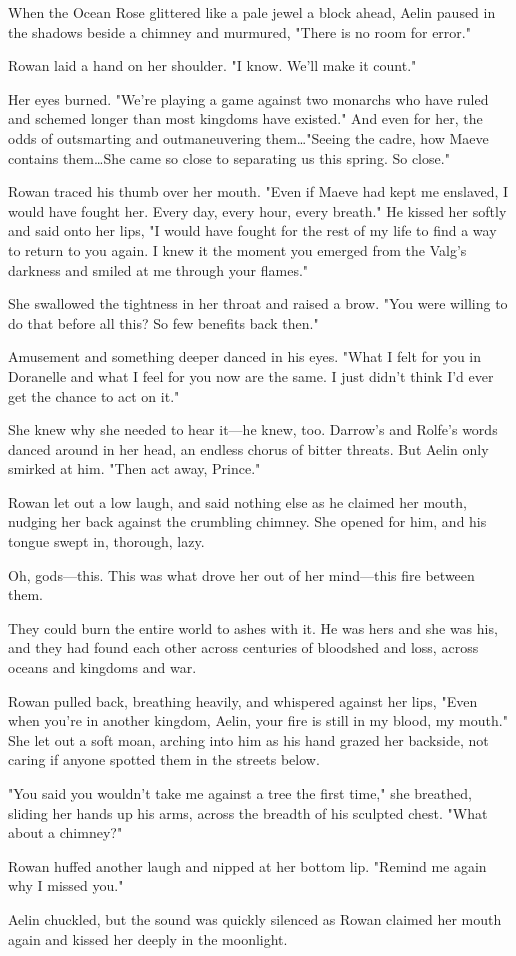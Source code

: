 When the Ocean Rose glittered like a pale jewel a block ahead, Aelin paused in the shadows beside a chimney and murmured, "There is no room for error."

Rowan laid a hand on her shoulder.
"I know.
We'll make it count."

Her eyes burned.
"We're playing a game against two monarchs who have ruled and schemed longer than most kingdoms have existed."
And even for her, the odds of outsmarting and outmaneuvering them\ldots "Seeing the cadre, how Maeve contains them\ldots She came so close to separating us this spring.
So close."

Rowan traced his thumb over her mouth.
"Even if Maeve had kept me enslaved, I would have fought her.
Every day, every hour, every breath."
He kissed her softly and said onto her lips, "I would have fought for the rest of my life to find a way to return to you again.
I knew it the moment you emerged from the Valg's darkness and smiled at me through your flames."

She swallowed the tightness in her throat and raised a brow.
"You were willing to do that before all this?
So few benefits back then."

Amusement and something deeper danced in his eyes.
"What I felt for you in Doranelle and what I feel for you now are the same.
I just didn't think I'd ever get the chance to act on it."

She knew why she needed to hear it---he knew, too.
Darrow's and Rolfe's words danced around in her head, an endless chorus of bitter threats.
But Aelin only smirked at him.
"Then act away, Prince."

Rowan let out a low laugh, and said nothing else as he claimed her mouth, nudging her back against the crumbling chimney.
She opened for him, and his tongue swept in, thorough, lazy.

Oh, gods---this.
This was what drove her out of her mind---this fire between them.

They could burn the entire world to ashes with it.
He was hers and she was his, and they had found each other across centuries of bloodshed and loss, across oceans and kingdoms and war.

Rowan pulled back, breathing heavily, and whispered against her lips, "Even when you're in another kingdom, Aelin, your fire is still in my blood, my mouth."
She let out a soft moan, arching into him as his hand grazed her backside, not caring if anyone spotted them in the streets below.

"You said you wouldn't take me against a tree the first time," she breathed, sliding her hands up his arms, across the breadth of his sculpted chest.
"What about a chimney?"

Rowan huffed another laugh and nipped at her bottom lip.
"Remind me again why I missed you."

Aelin chuckled, but the sound was quickly silenced as Rowan claimed her mouth again and kissed her deeply in the moonlight.
